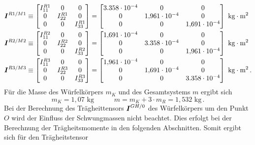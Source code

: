 \begin{equation}
\begin{split}
\boldsymbol{I}^{R1/M1} &\equiv \begin{bmatrix}
I^{R1}_{11} & 0 & 0 \\ 0 & I^{R1}_{22} & 0 \\ 0 & 0 & I^{R1}_{33}
\end{bmatrix} = 
\begin{bmatrix}
3.358\cdot 10^{-4} & 0 & 0 \\
0 & 1{,}961\cdot 10^{-4} & 0 \\
0 & 0 & 1{,}691\cdot 10^{-4}
\end{bmatrix} \text{ kg}\cdot \text{m}^2
\\
\boldsymbol{I}^{R2/M2} &\equiv \begin{bmatrix}
I^{R2}_{11} & 0 & 0 \\ 0 & I^{R2}_{22} & 0 \\ 0 & 0 & I^{R2}_{33}
\end{bmatrix} = 
\begin{bmatrix}
1{,}691\cdot 10^{-4} & 0 & 0 \\
0 & 3.358\cdot 10^{-4} & 0 \\
0 & 0 & 1{,}961\cdot 10^{-4}
\end{bmatrix} \text{ kg}\cdot \text{m}^2
\\
\boldsymbol{I}^{R3/M3} &\equiv \begin{bmatrix}
I^{R3}_{11} & 0 & 0 \\ 0 & I^{R3}_{22} & 0 \\ 0 & 0 & I^{R3}_{33}
\end{bmatrix} = 
\begin{bmatrix}
1{,}961\cdot 10^{-4} & 0 & 0 \\
0 & 1{,}691\cdot 10^{-4} & 0 \\
0 & 0 & 3.358\cdot 10^{-4}
\end{bmatrix} \text{ kg}\cdot \text{m}^2 \,.
\end{split}
\end{equation}
Für die Masse des Würfelkörpers $m_K$ und des Gesamtsystems $m$ ergibt sich
\begin{equation}
m_K = 1{,}07 \text{ kg} \hspace{35pt} m = m_K + 3\cdot m_R = 1{,}532 \text{ kg}\,.
\end{equation}
Bei der Berechnung des Trägheittensors $\boldsymbol{I}^{GH/0}$ des Würfelkörpers um den Punkt $O$ wird der Einfluss der Schwungmassen nicht beachtet. Dies erfolgt bei der Berechnung der Trägheitsmomente in den folgenden Abschnitten. Somit ergibt sich für den Trägheitstensor
